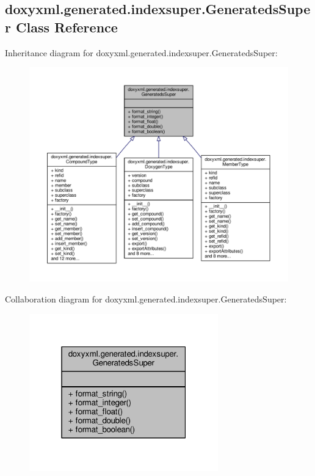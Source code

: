 \subsection{doxyxml.\+generated.\+indexsuper.\+Generateds\+Super Class Reference}
\label{classdoxyxml_1_1generated_1_1indexsuper_1_1GeneratedsSuper}


Inheritance diagram for doxyxml.\+generated.\+indexsuper.\+Generateds\+Super\+:
\nopagebreak
\begin{figure}[H]
\begin{center}
\leavevmode
\includegraphics[width=350pt]{d8/d00/classdoxyxml_1_1generated_1_1indexsuper_1_1GeneratedsSuper__inherit__graph}
\end{center}
\end{figure}


Collaboration diagram for doxyxml.\+generated.\+indexsuper.\+Generateds\+Super\+:
\nopagebreak
\begin{figure}[H]
\begin{center}
\leavevmode
\includegraphics[width=232pt]{d8/d58/classdoxyxml_1_1generated_1_1indexsuper_1_1GeneratedsSuper__coll__graph}
\end{center}
\end{figure}
